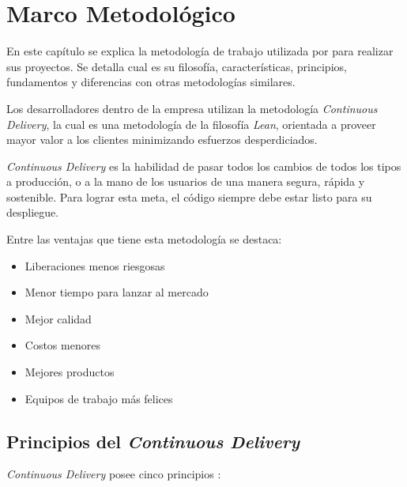 \chapter{Marco Metodológico}

En este capítulo se explica la metodología de trabajo utilizada por \business para realizar sus proyectos. Se detalla cual es su filosofía, características, principios, fundamentos y diferencias con otras metodologías similares.

Los desarrolladores dentro de la empresa utilizan la metodología \textit{Continuous Delivery}, la cual es una metodología de la filosofía \textit{Lean}, orientada a proveer mayor valor a los clientes minimizando esfuerzos desperdiciados.

\textit{Continuous Delivery} es la habilidad de pasar todos los cambios de todos los tipos a producción, o a la mano de los usuarios de una manera segura, rápida y sostenible. Para lograr esta meta, el código siempre debe estar listo para su despliegue. \cite{cddefinition}

Entre las ventajas que tiene esta metodología se destaca:

\begin{itemize}
    \item Liberaciones menos riesgosas
    \item Menor tiempo para lanzar al mercado
    \item Mejor calidad
    \item Costos menores
    \item Mejores productos
    \item Equipos de trabajo más felices
\end{itemize}

\section{Principios del \textit{Continuous Delivery}}

\textit{Continuous Delivery} posee cinco principios \cite{cdprinciples}:

